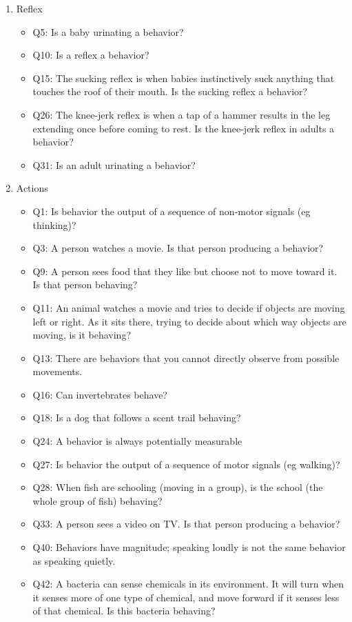 \begin{enumerate}
 \item Reflex
\begin{itemize}[label={}]
\item Q5: Is a baby urinating a behavior?
\item Q10: Is a reflex a behavior?
\item Q15: The sucking reflex is when babies instinctively suck anything that touches the roof of their mouth. Is the sucking reflex a behavior?
\item Q26: The knee-jerk reflex is when a tap of a hammer results in the leg extending once before coming to rest. Is the knee-jerk reflex in adults a behavior?
\item Q31: Is an adult urinating a behavior?
\end{itemize}
 \item Actions
\begin{itemize}[label={}]
\item Q1: Is behavior the output of a sequence of non-motor signals (eg thinking)?
\item Q3: A person watches a movie. Is that person producing a behavior?
\item Q9: A person sees food that they like but choose not to move toward it. Is that person behaving?
\item Q11: An animal watches a movie and tries to decide if objects are moving left or right. As it sits there, trying to decide about which way objects are moving, is it behaving?
\item Q13: There are behaviors that you cannot directly observe from possible movements.
\item Q16: Can invertebrates behave?
\item Q18: Is a dog that follows a scent trail behaving?
\item Q24: A behavior is always potentially measurable
\item Q27: Is behavior the output of a sequence of motor signals (eg walking)?
\item Q28: When fish are schooling (moving in a group), is the school (the whole group of fish) behaving?
\item Q33: A person sees a video on TV. Is that person producing a behavior?
\item Q40: Behaviors have magnitude; speaking loudly is not the same behavior as speaking quietly.
\item Q42: A bacteria can sense chemicals in its environment. It will turn when it senses more of one type of chemical, and move forward if it senses less of that chemical. Is this bacteria behaving?

\end{itemize}
\end{enumerate}
